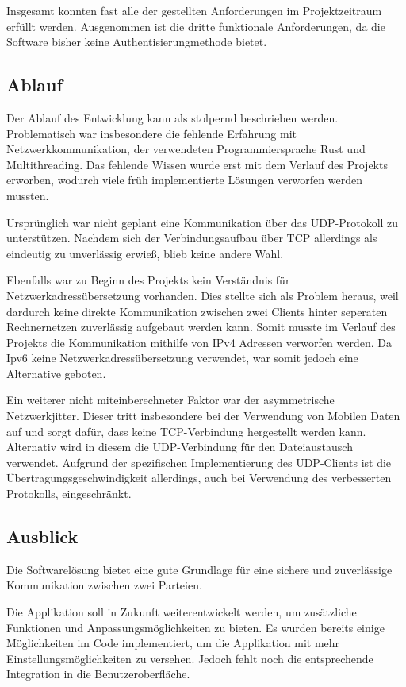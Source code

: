 Insgesamt konnten fast alle der gestellten Anforderungen im Projektzeitraum erfüllt werden. Ausgenommen ist die dritte funktionale Anforderungen, da die Software bisher keine Authentisierungmethode bietet.

\subsection{Ablauf}
Der Ablauf des Entwicklung kann als stolpernd beschrieben werden. Problematisch war insbesondere die fehlende Erfahrung mit Netzwerkkommunikation, der verwendeten Programmiersprache Rust und Multithreading. Das fehlende Wissen wurde erst mit dem Verlauf des Projekts erworben, wodurch viele früh implementierte Lösungen verworfen werden mussten.

Ursprünglich war nicht geplant eine Kommunikation über das UDP-Protokoll zu unterstützen. Nachdem sich der Verbindungsaufbau über TCP allerdings als eindeutig zu unverlässig erwieß, blieb keine andere Wahl.

Ebenfalls war zu Beginn des Projekts kein Verständnis für Netzwerkadressübersetzung vorhanden. Dies stellte sich als Problem heraus, weil dardurch keine direkte Kommunikation zwischen zwei Clients hinter seperaten Rechnernetzen zuverlässig aufgebaut werden kann. Somit musste im Verlauf des Projekts die Kommunikation mithilfe von IPv4 Adressen verworfen werden. Da Ipv6 keine Netzwerkadressübersetzung verwendet, war somit jedoch eine Alternative geboten.

Ein weiterer nicht miteinberechneter Faktor war der asymmetrische Netzwerkjitter. Dieser tritt insbesondere bei der Verwendung von Mobilen Daten auf und sorgt dafür, dass keine TCP-Verbindung hergestellt werden kann. Alternativ wird in diesem die UDP-Verbindung für den Dateiaustausch verwendet. Aufgrund der spezifischen Implementierung des UDP-Clients ist die Übertragungsgeschwindigkeit allerdings, auch bei Verwendung des verbesserten Protokolls, eingeschränkt.

\subsection{Ausblick}
Die Softwarelösung bietet eine gute Grundlage für eine sichere und zuverlässige Kommunikation zwischen zwei Parteien. 

Die Applikation soll in Zukunft weiterentwickelt werden, um zusätzliche Funktionen und Anpassungsmöglichkeiten zu bieten.
Es wurden bereits einige Möglichkeiten im Code implementiert, um die Applikation mit mehr Einstellungsmöglichkeiten zu versehen. Jedoch fehlt noch die entsprechende Integration in die Benutzeroberfläche.

